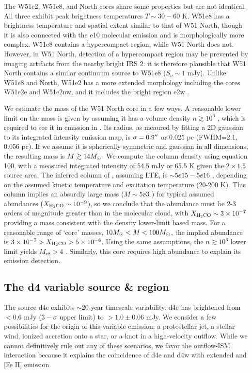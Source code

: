The W51e2, W51e8, and North cores share some properties but are not identical.
All three exhibit peak brightness temperatures $T\sim30-60$ K.  W51e8 has a
brightness temperature and spatial extent similar to that of W51 North, though
it is also connected with the e10 molecular emission and is morphologically
more complex.  W51e8 contains a hypercompact \hii region, while W51 North does
not.  However, in W51 North, detection of a hypercompact \hii region may be prevented by
imaging artifacts from the nearby bright IRS 2: it is therefore plausible that
W51 North contains a similar continuum source to W51e8 ($S_\nu \sim 1$ mJy).
Unlike W51e8 and North, W51e2 has a more extended morphology including
the cores W51e2e and W51e2nw, and it includes the bright \hchii region e2w
\citep{Shi2010a,Goddi2015a}.

We estimate the mass of the W51 North core in a few ways.  A reasonable lower limit
on the mass is given by assuming it has a volume density $n\gtrsim10^6$ \percc,
which is required to see it in emission in \ortho \twotwo.  Its radius, as
meaured by fitting a 2D gaussian to its integrated intensity emission map, is
$\sigma=0.9\mbox{$^{\prime\prime}$}$ or 0.025 pc (FWHM=2.1\arcsec, 0.056 pc).  If we assume it
is spherically symmetric and gaussian in
all dimensions, the resulting mass is $M\gtrsim14M_{\odot}$.
We compute the \ortho \twotwo column density using \citet{Mangum2015a} equation
100, with a measured integrated intensity of 54.5 mJy \kms or 65.5 K \kms given
the $2\times1.5$\arcsec source area.  The inferred column of \ortho,
assuming LTE, is $\sim5\ee{15} - 5\ee{16}$ \persc, depending on the assumed
kinetic temperature and excitation temperature (20-200 K).  This \formaldehyde column
implies an absurdly large mass ($M\sim5\ee{3}$ \msun) for typical assumed abundances
($X_{\textrm{H}_2\textrm{CO}}\sim10^{-9}$), so we conclude that the \formaldehyde abundance
must be 2-3 orders of magnitude greater than in the molecular cloud, with
$X_{\textrm{H}_2\textrm{CO}}\sim3\times10^{-7}$ providing a mass consistent with the density
lower-limit based mass.  For a reasonable range of `core' masses, $10
M_{\odot}<M<100 M_{\odot}$, the implied abundance is $3\times10^{-7} > X_{\textrm{H}_2\textrm{CO}} >
5\times10^{-8}$.
Using the same assumptions, the $n\gtrsim10^6$ \percc lower limit yields
$M_{e8}>4$ \msun.  Similarly, this core requires high abundance to explain its
emission detection.





\subsection{The d4 variable source \& \hh region}
\label{sec:d4}
The source d4e exhibits $\sim$20-year timescale variability.  d4e has
brightened from $<0.6$ mJy ($3-\sigma$ upper limit) to $>1.0\pm0.06$ mJy.  We
consider a few possibilities for the origin of this variable emission: a
protostellar jet,  a stellar wind, ionized accretion onto a star, or a knot in
a high-velocity outflow.  While we cannot definitively rule out any of these
scenarios, we favor the outflow-ISM interaction because it explains the
coincidence of d4e and d4w with extended \hh and [Fe II] emission.


